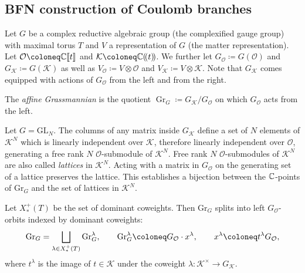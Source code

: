 
\subsection{BFN construction of Coulomb branches}

Let $G$ be a complex reductive algebraic group (the complexified gauge group) with maximal torus $T$ and $V$ a representation of $G$ (the matter representation). Let $\mathcal{O} \coloneq \C\llbracket t \rrbracket$ and $\mathcal{K} \coloneq \C(\!( t )\!)$. We further let $G_\mathcal{O} \coloneq G(\mathcal{O})$ and $G_\mathcal{K} \coloneq G(\mathcal{K})$ as well as $V_\mathcal{O} \coloneq V \otimes \mathcal{O}$ and $V_\mathcal{K} \coloneq V \otimes \mathcal{K}$. Note that $G_\mathcal{K}$ comes equipped with actions of $G_\mathcal{O}$ from the left and from the right.

\begin{definition}
	The \emph{affine Grassmannian} is the quotient $\operatorname{Gr}_G \coloneq G_\mathcal{K}/G_\mathcal{O}$ on which $G_\mathcal{O}$ acts from the left.
\end{definition}

\begin{example}
	Let $G = \mathrm{GL}_N$. The columns of any matrix inside $G_\mathcal{K}$ define a set of $N$ elements of $\mathcal{K}^N$ which is linearly independent over $\mathcal{K}$, therefore linearly independent over $\mathcal{O}$, generating a free rank $N$ $\mathcal{O}$-submodule of $\mathcal{K}^N$. Free rank $N$ $\mathcal{O}$-submodules of $\mathcal{K}^N$ are also called \emph{lattices} in $\mathcal{K}^N$. Acting with a matrix in $G_\mathcal{O}$ on the generating set of a lattice preserves the lattice. This establishes a bijection between the $\mathbb{C}$-points of $\mathrm{Gr}_G$ and the set of lattices in $\mathcal{K}^N$.
\end{example}

\begin{prop}
    Let $X_*^+(T)$ be the set of dominant coweights. Then $\mathrm{Gr}_G$ splits into left $G_\mathcal{O}$-orbits indexed by dominant coweights:
    \begin{equation}
		\textup{Gr}_G = \bigsqcup_{\lambda \in X_*^+(T)} \textup{Gr}_G^\lambda, \qquad \textup{Gr}_G^\lambda \coloneq G_\mathcal{O} \cdot x^\lambda, \qquad x^\lambda \coloneq t^\lambda G_\mathcal{O},
    \end{equation}
    where $t^\lambda$ is the image of $t \in \mathcal{K}$ under the coweight $\lambda \colon \mathcal{K}^\times \to G_\mathcal{K}$.
\end{prop}


